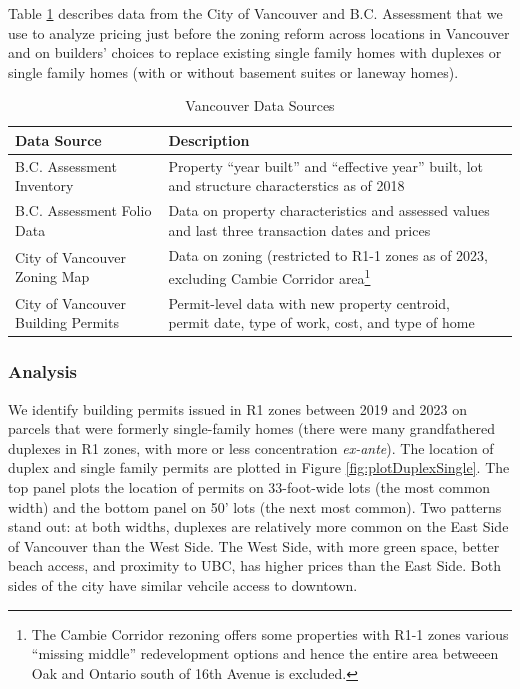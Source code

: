 \documentclass[12pt]{article}
\begin{document}
Table \ref{tab:dataSources} describes data from the City of Vancouver and B.C. Assessment that we use to analyze pricing just before the zoning reform across locations in Vancouver and on builders' choices to replace existing single family homes with duplexes or single family homes (with or without basement suites or laneway homes).

\begin{table}
	\caption{\label{tab:dataSources} Vancouver Data Sources}
	\begin{tabular}{lll}
		\hline
		Data Source & Description \\
		\hline
		B.C. Assessment Inventory & Property ``year built'' and ``effective year'' built, lot and structure characterstics as of 2018\\
		B.C. Assessment Folio Data & Data on property characteristics and assessed values and last three transaction dates and prices \\
		City of Vancouver Zoning Map & Data on zoning (restricted to R1-1 zones as of 2023, excluding Cambie Corridor area\footnote{The Cambie Corridor rezoning offers some properties with R1-1 zones various ``missing middle'' redevelopment options and hence the entire area betweeen Oak and Ontario south of 16th Avenue is excluded.} \\
		City of Vancouver Building Permits & Permit-level data with new property centroid, permit date, type of work, cost, and type of home\\
		\hline
	\end{tabular}
\end{table}

\subsubsection{Analysis}

We identify building permits issued in R1 zones between 2019 and 2023 on parcels that were formerly single-family homes (there were many grandfathered duplexes in R1 zones, with more or less concentration \textit{ex-ante}). The location of duplex and single family permits are plotted in Figure \ref{fig:plotDuplexSingle}. The top panel plots the location of permits on 33-foot-wide lots (the most common width) and the bottom panel on 50' lots (the next most common). Two patterns stand out: at both widths, duplexes are relatively more common on the East Side of Vancouver than the West Side. The West Side, with more green space, better beach access, and proximity to UBC, has higher prices than the East Side. Both sides of the city have similar vehcile access to downtown. 
\end{document}
